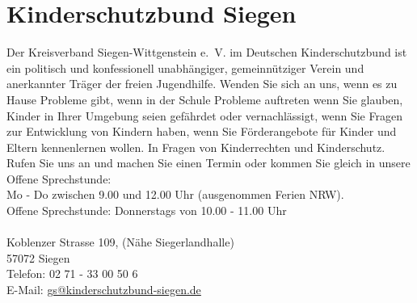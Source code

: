 \section{Kinderschutzbund Siegen}
Der Kreisverband Siegen-Wittgenstein e.~V. im Deutschen Kinderschutzbund ist ein politisch und konfessionell unabhängiger, gemeinnütziger Verein und anerkannter Träger der freien Jugendhilfe. Wenden Sie sich an uns, wenn es zu Hause Probleme 
gibt, wenn in der Schule Probleme auftreten wenn Sie glauben, Kinder in Ihrer Umgebung seien gefährdet oder vernachlässigt, wenn Sie Fragen zur Entwicklung von Kindern haben, wenn Sie Förderangebote für Kinder und Eltern kennenlernen wollen. In Fragen von Kinderrechten und Kinderschutz. Rufen Sie uns an und machen Sie einen Termin oder kommen Sie gleich in unsere Offene Sprechstunde: \\
Mo - Do zwischen 9.00 und 12.00 Uhr (ausgenommen Ferien NRW). \\
Offene Sprechstunde: Donnerstags von 10.00 - 11.00 Uhr  \\
\\ 
Koblenzer Strasse 109,  (Nähe Siegerlandhalle)\\ 
57072 Siegen\\
Telefon: 02 71 - 33 00 50 6\\
E-Mail: \href{mailto:gs@kinderschutzbund-siegen.de}{gs@kinderschutzbund-siegen.de} 
